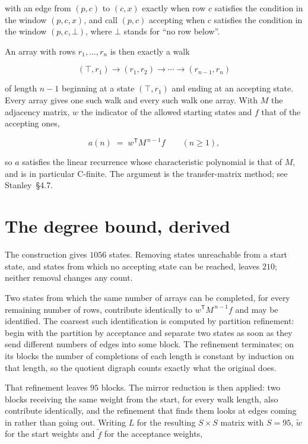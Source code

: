\documentclass[11pt]{article}
\theoremstyle{definition}
\begin{document}
with an edge from $(p,c)$ to $(c,x)$ exactly when row $c$ satisfies the condition in the window $(p,c,x)$, and call $(p,c)$ accepting when $c$ satisfies the condition in the window $(p,c,\bot)$, where $\bot$ stands for ``no row below''.

An array with rows $r_1,\dots,r_n$ is then exactly a walk

\[(\top,r_1) \to (r_1,r_2) \to \cdots \to (r_{n-1},r_n)\]

of length $n-1$ beginning at a state $(\top,r_1)$ and ending at an accepting state. Every array gives one such walk and every such walk one array. With $M$ the adjacency matrix, $w$ the indicator of the allowed starting states and $f$ that of the accepting ones,

\[a(n) \;=\; w^{\mathsf T} M^{\,n-1} f \qquad (n \ge 1),\]

so $a$ satisfies the linear recurrence whose characteristic polynomial is that of $M$, and is in particular C-finite. The argument is the transfer-matrix method; see Stanley~\S4.7.

\section{The degree bound, derived}

The construction gives $1056$ states. Removing states unreachable from a start state, and states from which no accepting state can be reached, leaves $210$; neither removal changes any count.

Two states from which the same number of arrays can be completed, for every remaining number of rows, contribute identically to $w^{\mathsf T}M^{\,n-1}f$ and may be identified. The coarsest such identification is computed by partition refinement: begin with the partition by acceptance and separate two states as soon as they send different numbers of edges into some block. The refinement terminates; on its blocks the number of completions of each length is constant by induction on that length, so the quotient digraph counts exactly what the original does.

That refinement leaves $95$ blocks. The mirror reduction is then applied: two blocks receiving the same weight from the start, for every walk length, also contribute identically, and the refinement that finds them looks at edges coming in rather than going out. Writing $L$ for the resulting $S \times S$ matrix with $S = 95$, $\tilde w$ for the start weights and $\tilde f$ for the acceptance weights,
\end{document}
